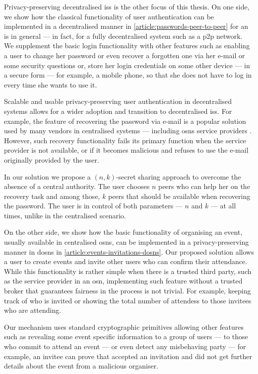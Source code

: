 \documentclass[showtrims, oldfontcommands]{kthesis}
\begin{document}
Privacy-preserving decentralised \acp{is} is the other focus of this 
thesis. On one side, we show how the classical functionality of user authentication 
can be implemented in a decentralised manner in \cref{article:passwords-peer-to-peer} 
for an \ac{is} in general --- in fact, for a fully decentralised system 
such as a \ac{p2p} network. We supplement the basic login functionality with other 
features such as enabling a user to change her password or even recover a forgotten 
one via her e-mail or some security questions or, store her login credentials on 
some other device --- in a secure form --- for example, a mobile phone, so that 
she does not have to log in every time she wants to use it.

Scalable and usable privacy-preserving user authentication in decentralised systems 
allows for a wider adoption and transition to decentralised \acp{is}. 
For example, the feature of recovering the password via e-mail is a popular solution 
used by many vendors in centralised systems --- including \acp{osn} service providers 
\cite{Kuzma11}. However, such recovery functionality fails its primary function 
when the service provider is not available, or if it becomes malicious and refuses 
to use the e-mail originally provided by the user. 

In our solution we propose a $(n, k)$-secret sharing approach to overcome the absence 
of a central authority. The user chooses $n$ peers who can help her on the recovery 
task and among those, $k$ peers that should be available when recovering the password. 
The user is in control of both parameters --- $n$ and $k$ ---  at all times, unlike 
in the centralised scenario.

On the other side, we show how the basic functionality of organising an event, usually 
available in centralised \acp{osn}, can be implemented in a privacy-preserving manner 
in \acp{dosn} in \cref{article:events-invitations-dosns}. Our proposed solution 
allows a user to create events and invite other users who can confirm their attendance. 
While this functionality is rather simple when there is a trusted third party, such as 
the service provider in an \ac{osn}, implementing such feature without a trusted 
broker that guarantees fairness in the process is not trivial. For example, keeping 
track of who is invited or showing the total number of attendess to those invitees 
who are attending.

Our mechanism uses standard cryptographic primitives allowing other features such 
as revealing some event specific information to a group of users --- to those who 
commit to attend an event --- or even detect any misbehaving party --- for example, 
an invitee can prove that accepted an invitation and did not get further details 
about the event from a malicious organiser.
\end{document}
